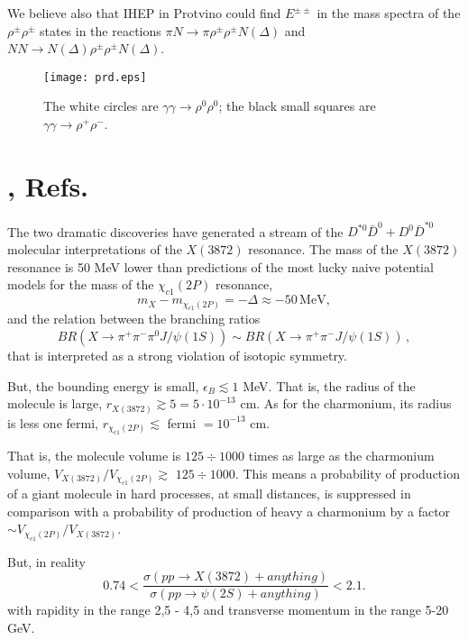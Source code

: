 \documentclass[aps,preprint,groupedaddress,floatfix]{revtex4}
\begin{document}
We \cite{I=21991,I=21992} believe also that IHEP in Protvino could
find $E^{\pm\pm}$ in the mass spectra  of the
$\rho^{\pm}\rho^{\pm}$ states in the reactions $\pi
N\to\pi\rho^{\pm}\rho^{\pm}N(\Delta)$ and $N N\to N(\Delta)
\rho^{\pm}\rho^{\pm}N(\Delta)$.

 \begin{figure}[h]
\centering
\texttt{[image: prd.eps]}
\caption{The white circles are  $\gamma\gamma\to\rho^0\rho^0$; the
black small squares are  $\gamma\gamma\to\rho^+\rho^-$.}
\label{fig-2}
\end{figure}

\section{{\bf{}, Refs.  \cite{NNA+EVR,NNA+EVR+,NNA3872}}}
\label{sec-3}

The two dramatic discoveries have generated a stream of the
$D^{*0}\bar D^0+D^0\bar D^{*0}$  molecular interpretations of the
$X(3872)$ resonance.
 The mass of the $X(3872)$ resonance is 50 MeV lower than predictions of the most lucky naive  potential
models for the mass of the $\chi_{c1}(2P)$ resonance,
\begin{equation}
\label{shiftmass} m_X-m_{\chi_{c1}(2P)}= -\Delta\approx -
50\,\mbox{MeV},\nonumber
\end{equation}
and the relation between the branching ratios
\begin{equation}
\label{isotopicviolation}
 BR(X\to\pi^+\pi^-\pi^0J/\psi(1S))\sim
BR(X\to\pi^+\pi^-J/\psi(1S))\,\nonumber,
\end{equation}
that is interpreted as a strong violation of isotopic symmetry.

But, the bounding energy is small, $\epsilon_B\lesssim 1$ MeV.
That is, the radius of the molecule is large, $r_{X(3872)}\gtrsim
5 = 5\cdot 10^{-13}$ cm. As for the charmonium, its radius is less
one  fermi, $r_{\chi_{c1}(2P)}\lesssim$  fermi $= 10^{-13}$ cm.

 That is, the molecule volume is  $125\div 1000$ times
as large as the charmonium volume,
$V_{X(3872)}/V_{\chi_{c1}(2P)}\gtrsim$  $125\div 1000$. This means
a probability of production of a giant molecule in hard processes,
at small distances, is suppressed in comparison with a probability
of production of heavy a charmonium by  a factor  $\sim
V_{\chi_{c1}(2P)}/V_{X(3872)}$.

But, in reality
\cite{LHCb2012,NNA+EVR+,NNA3872,pdg-2018,Belle2009}
\begin{equation}
 0.74<\frac{\sigma (pp \to X(3872)
+ anything)}{ \sigma (pp\to\psi(2S) + anything)} <2.1.\nonumber
\end{equation}
 with rapidity in
the range 2,5 - 4,5 and transverse momentum in the range 5-20 GeV.
\end{document}
